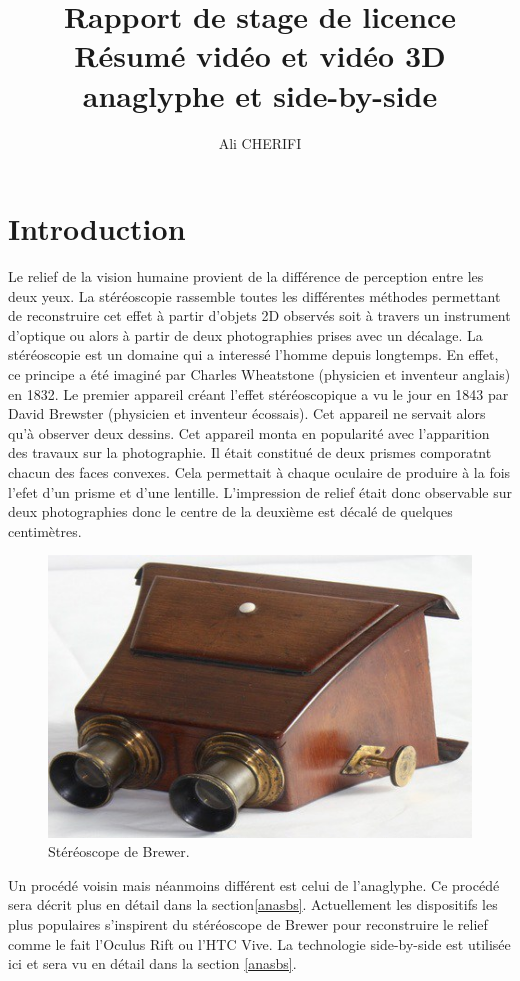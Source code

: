 \documentclass[10pt,a4paper]{article}
\author{Ali CHERIFI}
\title{Rapport de stage de licence\\Résumé vidéo et vidéo 3D anaglyphe et side-by-side}
\begin{document}
\maketitle
\newpage
\tableofcontents
\newpage
\section{Introduction}
Le relief de la vision humaine provient de la différence de perception entre les deux yeux. La stéréoscopie rassemble toutes les différentes méthodes permettant de reconstruire cet effet à partir d'objets 2D
observés soit à travers un instrument d'optique ou alors à partir de deux photographies prises avec un décalage.
La stéréoscopie est un domaine qui a interessé l'homme depuis longtemps. En effet, ce principe a été imaginé par Charles Wheatstone (physicien et inventeur anglais) en 1832.
Le premier appareil créant l'effet stéréoscopique a vu le jour en 1843 par David Brewster (physicien et inventeur écossais). Cet appareil ne servait alors qu'à observer deux dessins.
Cet appareil monta en popularité avec l'apparition des travaux sur la photographie. Il était constitué de deux prismes comporatnt chacun des faces convexes. Cela permettait à chaque oculaire de
produire à la fois l'efet d'un prisme et d'une lentille. L'impression de relief était donc observable sur deux photographies donc le centre de la deuxième est décalé de quelques centimètres.

\begin{figure}[!h]
\center
\includegraphics[scale = 0.5]{brewer.jpg}
\caption{Stéréoscope de Brewer.}
\end{figure}

Un procédé voisin mais néanmoins différent est celui de l'anaglyphe. Ce procédé sera décrit plus en détail dans la section\ref{anasbs}.
Actuellement les dispositifs les plus populaires s'inspirent du stéréoscope de Brewer pour reconstruire le relief comme le fait l'Oculus Rift ou l'HTC Vive. La technologie side-by-side est utilisée ici et
sera vu en détail dans la section \ref{anasbs}.
\end{document}
